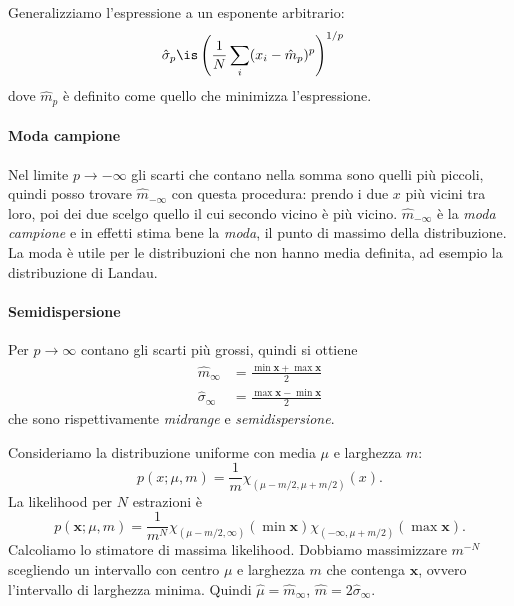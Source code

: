 Generalizziamo l'espressione a un esponente arbitrario:
\begin{align*}
	\hat\sigma_p
	&\is \left(\frac1N \sum_i (x_i - \hat m_p)^p\right)^{1/p}
\end{align*}
dove $\hat m_p$ è definito come quello che minimizza l'espressione.

\paragraph{Moda campione}

Nel limite $p\to-\infty$ gli scarti che contano nella somma sono quelli più piccoli,
quindi posso trovare $\hat m_{-\infty}$ con questa procedura:
prendo i due $x$ più vicini tra loro, poi dei due scelgo quello il cui secondo vicino è più vicino.
$\hat m_{-\infty}$ è la \emph{moda campione} e in effetti stima bene la \emph{moda},
il punto di massimo della distribuzione.
La moda è utile per le distribuzioni che non hanno media definita,
ad esempio la distribuzione di Landau.

\paragraph{Semidispersione}

Per $p\to\infty$ contano gli scarti più grossi,
quindi si ottiene
\begin{align*}
	\hat m_\infty
	&= \frac{\min\mathbf x + \max\mathbf x}2 \\
	\hat\sigma_\infty
	&= \frac{\max\mathbf x - \min\mathbf x}2
\end{align*}
che sono rispettivamente \emph{midrange} e \emph{semidispersione}.
\begin{example}
	Consideriamo la distribuzione uniforme con media $\mu$ e larghezza $m$:
	\begin{equation*}
		p(x;\mu,m)
		= \frac1m \chi_{(\mu-m/2,\mu+m/2)}(x).
	\end{equation*}
	La likelihood per $N$ estrazioni è
	\begin{equation*}
		p(\mathbf x;\mu,m)
		= \frac1{m^N} \chi_{(\mu-m/2,\infty)}(\min\mathbf x) \chi_{(-\infty,\mu+m/2)}(\max\mathbf x).
	\end{equation*}
	Calcoliamo lo stimatore di massima likelihood.
	Dobbiamo massimizzare $m^{-N}$ scegliendo un intervallo con centro $\mu$ e larghezza $m$ che contenga $\mathbf x$,
	ovvero l'intervallo di larghezza minima.
	Quindi $\hat\mu=\hat m_\infty$, $\hat m=2\hat\sigma_\infty$.
\end{example}

